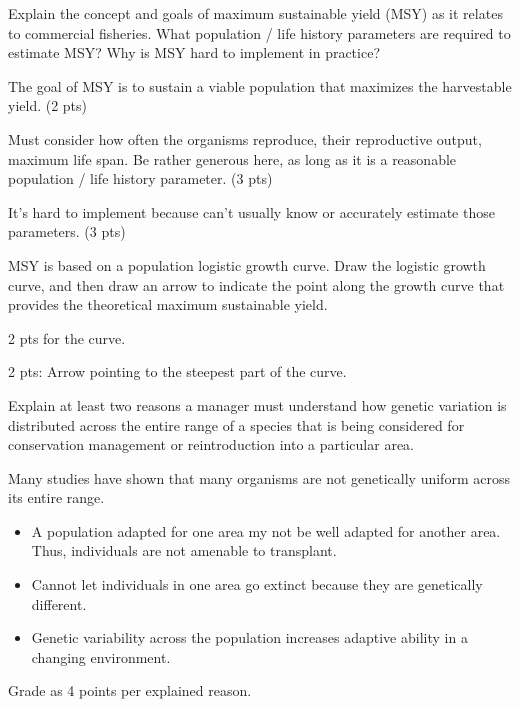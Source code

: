 \documentclass[11pt]{exam}
\begin{document}
\begin{questions}
\question[10]
Explain the concept and goals of maximum sustainable yield (MSY) as
it relates to commercial fisheries. What population / life history
parameters are required to estimate MSY? Why is MSY hard to implement in
practice?

\begin{solution}

The goal of MSY is to sustain a viable population that maximizes the harvestable yield. (2 pts)

Must consider how often the organisms reproduce, their reproductive output, maximum life span. Be rather generous here, as long as it is a reasonable population / life history parameter. (3 pts)

It's hard to implement because can't usually know or accurately estimate those parameters. (3 pts)

\end{solution}

\newpage

\question[5]
 MSY is based on a population logistic growth curve. Draw the logistic
growth curve, and then draw an arrow to indicate the point along the
growth curve that provides the theoretical maximum sustainable yield.

\begin{minipage}[t][3in]{0.95\textwidth}%
\begin{solution}
2 pts for the curve. 

2 pts: Arrow pointing to the steepest part of the curve.


\end{solution}
\end{minipage}

\question[10]
Explain at least two reasons a manager must understand how genetic variation is
distributed across the entire range of a species that is being
considered for conservation management or reintroduction into a
particular area.

\begin{solution}
Many studies have shown that many organisms are not genetically uniform across its entire range.  

\begin{itemize}

\item A population adapted for one area my not be well adapted for another area. Thus, individuals are not amenable to transplant.

\item Cannot let individuals in one area go extinct because they are genetically different. 

\item Genetic variability across the population increases adaptive ability in a changing environment.
\end{itemize}

Grade as 4 points per explained reason.

\end{solution}


\end{questions}
\end{document}
